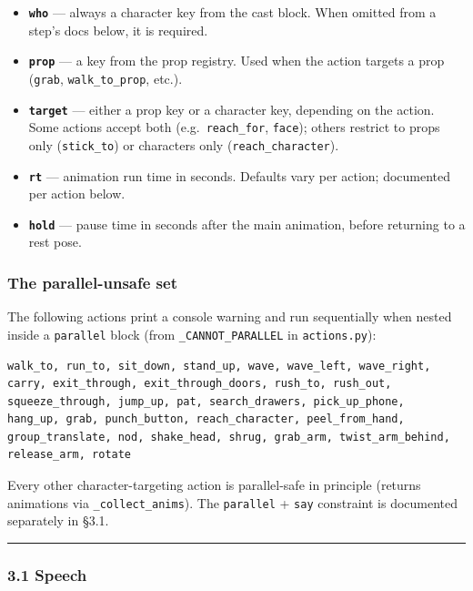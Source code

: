 \documentclass[
  12pt,
  letterpaper,
]{book}
\providecommand{\tightlist}{%
  \setlength{\itemsep}{0pt}\setlength{\parskip}{0pt}}
\begin{document}
\begin{itemize}
\tightlist
\item
  \textbf{\texttt{who}} --- always a character key from the cast block.
  When omitted from a step's docs below, it is required.
\item
  \textbf{\texttt{prop}} --- a key from the prop registry. Used when the
  action targets a prop (\texttt{grab}, \texttt{walk\_to\_prop}, etc.).
\item
  \textbf{\texttt{target}} --- either a prop key or a character key,
  depending on the action. Some actions accept both
  (e.g.~\texttt{reach\_for}, \texttt{face}); others restrict to props
  only (\texttt{stick\_to}) or characters only
  (\texttt{reach\_character}).
\item
  \textbf{\texttt{rt}} --- animation run time in seconds. Defaults vary
  per action; documented per action below.
\item
  \textbf{\texttt{hold}} --- pause time in seconds after the main
  animation, before returning to a rest pose.
\end{itemize}

\subsubsection{The parallel-unsafe set}\label{the-parallel-unsafe-set}

The following actions print a console warning and run sequentially when
nested inside a \texttt{parallel} block (from
\texttt{\_CANNOT\_PARALLEL} in \texttt{actions.py}):

\begin{verbatim}
walk_to, run_to, sit_down, stand_up, wave, wave_left, wave_right,
carry, exit_through, exit_through_doors, rush_to, rush_out,
squeeze_through, jump_up, pat, search_drawers, pick_up_phone,
hang_up, grab, punch_button, reach_character, peel_from_hand,
group_translate, nod, shake_head, shrug, grab_arm, twist_arm_behind,
release_arm, rotate
\end{verbatim}

Every other character-targeting action is parallel-safe in principle
(returns animations via \texttt{\_collect\_anims}). The
\texttt{parallel} + \texttt{say} constraint is documented separately in
§3.1.

\begin{center}\rule{0.5\linewidth}{0.5pt}\end{center}

\subsubsection{3.1 Speech}\label{speech}
\end{document}
